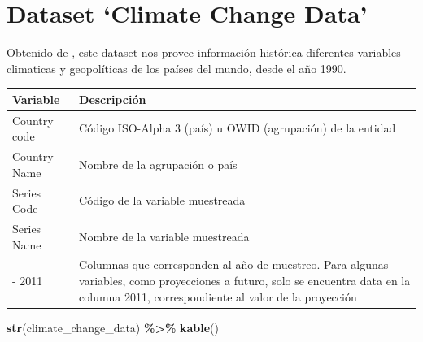 \documentclass[
]{book}
\newenvironment{Shaded}{\begin{snugshade}}{\end{snugshade}}
\newcommand{\FunctionTok}[1]{\textcolor[rgb]{0.13,0.29,0.53}{\textbf{#1}}}
\newcommand{\NormalTok}[1]{#1}
\newcommand{\SpecialCharTok}[1]{\textcolor[rgb]{0.81,0.36,0.00}{\textbf{#1}}}
\begin{document}
\begin{tabular}{}
\hline

\hline
\end{tabular}

\section{Dataset `Climate Change Data'}\label{dataset-climate-change-data}

Obtenido de \citep{ref155}, este dataset nos provee información histórica diferentes variables climaticas y geopolíticas de los países del mundo, desde el año 1990.

\begin{longtable}[]{@{}
  >{\raggedright\arraybackslash}p{}
  >{\raggedright\arraybackslash}p{}@{}}
\toprule\noalign{}
\begin{minipage}[b]{\linewidth}\raggedright
Variable
\end{minipage} & \begin{minipage}[b]{\linewidth}\raggedright
Descripción
\end{minipage} \\
\midrule\noalign{}
\endhead
\bottomrule\noalign{}
\endlastfoot
Country code & Código ISO-Alpha 3 (país) u OWID (agrupación) de la entidad \\
Country Name & Nombre de la agrupación o país \\
Series Code & Código de la variable muestreada \\
Series Name & Nombre de la variable muestreada \\
1990 - 2011 & Columnas que corresponden al año de muestreo. Para algunas variables, como proyecciones a futuro, solo se encuentra data en la columna 2011, correspondiente al valor de la proyección \\
\end{longtable}

\begin{Shaded}
\begin{Highlighting}[]
\FunctionTok{str}\NormalTok{(climate\_change\_data) }\SpecialCharTok{\%\textgreater{}\%} \FunctionTok{kable}\NormalTok{()}
\end{Highlighting}
\end{Shaded}
\end{document}
